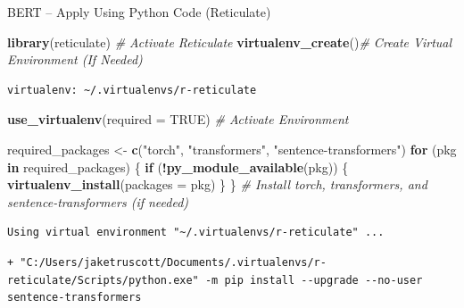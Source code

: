 \documentclass[
  ignorenonframetext,
  aspectratio=169]{beamer}
\newenvironment{Shaded}{\begin{snugshade}}{\end{snugshade}}
\newcommand{\AttributeTok}[1]{\textcolor[rgb]{0.13,0.29,0.53}{#1}}
\newcommand{\CommentTok}[1]{\textcolor[rgb]{0.56,0.35,0.01}{\textit{#1}}}
\newcommand{\ConstantTok}[1]{\textcolor[rgb]{0.56,0.35,0.01}{#1}}
\newcommand{\ControlFlowTok}[1]{\textcolor[rgb]{0.13,0.29,0.53}{\textbf{#1}}}
\newcommand{\FunctionTok}[1]{\textcolor[rgb]{0.13,0.29,0.53}{\textbf{#1}}}
\newcommand{\NormalTok}[1]{#1}
\newcommand{\OtherTok}[1]{\textcolor[rgb]{0.56,0.35,0.01}{#1}}
\newcommand{\SpecialCharTok}[1]{\textcolor[rgb]{0.81,0.36,0.00}{\textbf{#1}}}
\newcommand{\StringTok}[1]{\textcolor[rgb]{0.31,0.60,0.02}{#1}}
\begin{document}
\begin{frame}[fragile]{BERT -- Apply Using Python Code (Reticulate)}
\label{bert-apply-using-python-code-reticulate}
\scriptsize

\begin{Shaded}
\begin{Highlighting}[]
\FunctionTok{library}\NormalTok{(reticulate) }\CommentTok{\# Activate Reticulate}
\FunctionTok{virtualenv\_create}\NormalTok{()}\CommentTok{\# Create  Virtual Environment (If Needed)}
\end{Highlighting}
\end{Shaded}

\begin{verbatim}
virtualenv: ~/.virtualenvs/r-reticulate
\end{verbatim}

\begin{Shaded}
\begin{Highlighting}[]
\FunctionTok{use\_virtualenv}\NormalTok{(}\AttributeTok{required =} \ConstantTok{TRUE}\NormalTok{) }\CommentTok{\# Activate Environment}

\NormalTok{required\_packages }\OtherTok{\textless{}{-}} \FunctionTok{c}\NormalTok{(}\StringTok{"torch"}\NormalTok{, }\StringTok{"transformers"}\NormalTok{, }\StringTok{"sentence{-}transformers"}\NormalTok{)}
\ControlFlowTok{for}\NormalTok{ (pkg }\ControlFlowTok{in}\NormalTok{ required\_packages) \{}
  \ControlFlowTok{if}\NormalTok{ (}\SpecialCharTok{!}\FunctionTok{py\_module\_available}\NormalTok{(pkg)) \{}
    \FunctionTok{virtualenv\_install}\NormalTok{(}\AttributeTok{packages =}\NormalTok{ pkg)}
\NormalTok{  \}}
\NormalTok{\} }\CommentTok{\# Install torch, transformers, and sentence{-}transformers (if needed)}
\end{Highlighting}
\end{Shaded}

\begin{verbatim}
Using virtual environment "~/.virtualenvs/r-reticulate" ...
\end{verbatim}

\begin{verbatim}
+ "C:/Users/jaketruscott/Documents/.virtualenvs/r-reticulate/Scripts/python.exe" -m pip install --upgrade --no-user sentence-transformers
\end{verbatim}
\end{frame}
\end{document}
